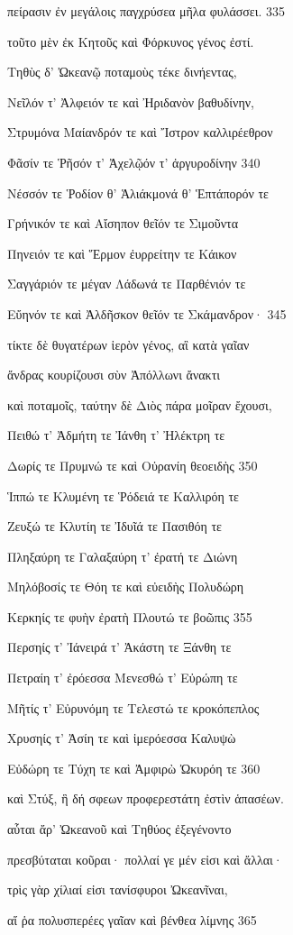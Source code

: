 πείρασιν ἐν μεγάλοις παγχρύσεα μῆλα φυλάσσει. \num{335}

τοῦτο μὲν ἐκ Κητοῦς καὶ Φόρκυνος γένος ἐστί. 

Τηθὺς δ' Ὠκεανῷ ποταμοὺς τέκε δινήεντας,

Νεῖλόν τ' Ἀλφειόν τε καὶ Ἠριδανὸν βαθυδίνην,

Στρυμόνα Μαίανδρόν τε καὶ Ἴστρον καλλιρέεθρον

Φᾶσίν τε Ῥῆσόν τ' Ἀχελῷόν τ' ἀργυροδίνην \num{340}

Νέσσόν τε Ῥοδίον θ' Ἁλιάκμονά θ' Ἑπτάπορόν τε

Γρήνικόν τε καὶ Αἴσηπον θεῖόν τε Σιμοῦντα

Πηνειόν τε καὶ Ἕρμον ἐυρρείτην τε Κάικον

Σαγγάριόν τε μέγαν Λάδωνά τε Παρθένιόν τε

Εὔηνόν τε καὶ Ἀλδῆσκον θεῖόν τε Σκάμανδρον· \num{345}

τίκτε δὲ θυγατέρων ἱερὸν γένος, αἳ κατὰ γαῖαν

ἄνδρας κουρίζουσι σὺν Ἀπόλλωνι ἄνακτι

καὶ ποταμοῖς, ταύτην δὲ Διὸς πάρα μοῖραν ἔχουσι,

Πειθώ τ' Ἀδμήτη τε Ἰάνθη τ' Ἠλέκτρη τε

Δωρίς τε Πρυμνώ τε καὶ Οὐρανίη θεοειδὴς \num{350}

Ἱππώ τε Κλυμένη τε Ῥόδειά τε Καλλιρόη τε

Ζευξώ τε Κλυτίη τε Ἰδυῖά τε Πασιθόη τε

Πληξαύρη τε Γαλαξαύρη τ' ἐρατή τε Διώνη

Μηλόβοσίς τε Θόη τε καὶ εὐειδὴς Πολυδώρη 

Κερκηίς τε φυὴν ἐρατὴ Πλουτώ τε βοῶπις \num{355}

Περσηίς τ' Ἰάνειρά τ' Ἀκάστη τε Ξάνθη τε

Πετραίη τ' ἐρόεσσα Μενεσθώ τ' Εὐρώπη τε

Μῆτίς τ' Εὐρυνόμη τε Τελεστώ τε κροκόπεπλος

Χρυσηίς τ' Ἀσίη τε καὶ ἱμερόεσσα Καλυψὼ

Εὐδώρη τε Τύχη τε καὶ Ἀμφιρὼ Ὠκυρόη τε \num{360}

καὶ Στύξ, ἣ δή σφεων προφερεστάτη ἐστὶν ἁπασέων.

αὗται ἄρ' Ὠκεανοῦ καὶ Τηθύος ἐξεγένοντο

πρεσβύταται κοῦραι· πολλαί γε μέν εἰσι καὶ ἄλλαι·

τρὶς γὰρ χίλιαί εἰσι τανίσφυροι Ὠκεανῖναι,

αἵ ῥα πολυσπερέες γαῖαν καὶ βένθεα λίμνης \num{365}

